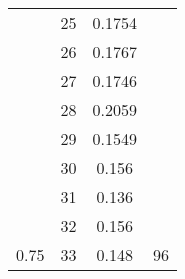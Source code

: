 \documentclass{article}
\begin{document}
\begin{multicols}{2}
\begin{table}[H]
\begin{tabular}{|c|c|c|c|}
 & 25 & 0.1754 &  \\ \cline{2-3}
 & 26 & 0.1767 &  \\ \cline{2-3}
 & 27 & 0.1746 &  \\ \cline{2-3}
 & 28 & 0.2059 &  \\ \cline{2-3}
 & 29 & 0.1549 &  \\ \cline{2-3}
 & 30 & 0.156 &  \\ \cline{2-3}
 & 31 & 0.136 &  \\ \cline{2-3}
 & 32 & 0.156 &  \\ \cline{2-3}
\multirow{-34}{*}{0.75} & 33 & 0.148 & \multirow{-9}{*}{96} \\ \hline
\end{tabular}
\end{table}


\end{multicols}
\newpage
\end{document}
